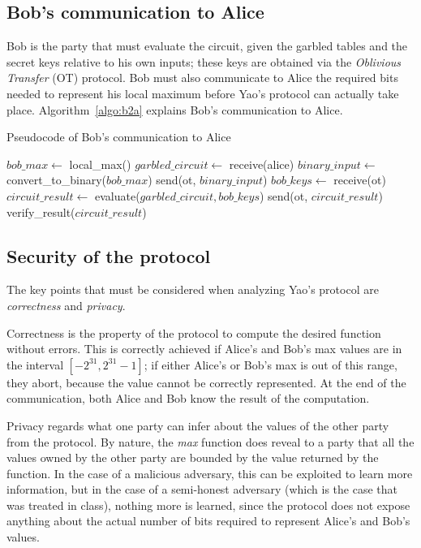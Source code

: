 \subsection{Bob's communication to Alice}

Bob is the party that must evaluate the circuit, given the garbled tables and the secret keys relative to his own inputs; these keys are obtained via the \textit{Oblivious Transfer} (OT) protocol. Bob must also communicate to Alice the required bits needed to represent his local maximum before Yao's protocol can actually take place. Algorithm~\ref{algo:b2a} explains Bob's communication to Alice.

\begin{algorithm}
    \DontPrintSemicolon
    \caption{Pseudocode of Bob's communication to Alice}\label{algo:b2a}
    $bob\_max \gets$ local\_max()\;
    \BlankLine
    $garbled\_circuit \gets$ receive(alice)\;
    $binary\_input \gets $ convert\_to\_binary($bob\_max$)\;
    send(ot, $binary\_input$)\;
    $bob\_keys \gets$ receive(ot)\;
    $circuit\_result \gets$ evaluate($garbled\_circuit, bob\_keys$)\;
    send(ot, $circuit\_result$)\;
    \BlankLine
    verify\_result($circuit\_result$)
\end{algorithm}

\subsection{Security of the protocol}

The key points that must be considered when analyzing Yao's protocol are \textit{correctness} and \textit{privacy}. 

Correctness is the property of the protocol to compute the desired function without errors. This is correctly achieved if Alice's and Bob's max values are in the interval $[-2^{31}, 2^{31}-1]$; if either Alice's or Bob's max is out of this range, they abort, because the value cannot be correctly represented. At the end of the communication, both Alice and Bob know the result of the computation.

Privacy regards what one party can infer about the values of the other party from the protocol. By nature, the \textit{max} function does reveal to a party that all the values owned by the other party are bounded by the value returned by the function. In the case of a malicious adversary, this can be exploited to learn more information, but in the case of a semi-honest adversary (which is the case that was treated in class), nothing more is learned, since the protocol does not expose anything about the actual number of bits required to represent Alice's and Bob's values.